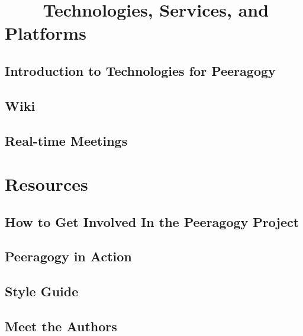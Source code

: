 \documentclass[ebook, 12pt, twoside]{memoir}
\begin{document}
\part{~~~~Technologies, Services, and Platforms } %
%
\chapter[\textbf{Peeragogy Technology}]{Introduction to Technologies for Peeragogy}

%
\chapter[\textbf{Wiki}]{ Wiki } 
%

%
\chapter[\textbf{Real-time Meetings}]{ Real-time Meetings } 
%

%
\part{Resources} %
%
\chapter[\textbf{How to get involved}]{ How to Get Involved In the Peeragogy Project } 
%

%
\chapter[\textbf{Peeragogy in Action}]{Peeragogy in Action}
%

%
\chapter[\textbf{Style Guide}]{Style Guide}
%

%
\chapter[\textbf{Meet the Authors}]{Meet the Authors}
%

%
%
\newpage
\thispagestyle{empty}

%
\end{document}
